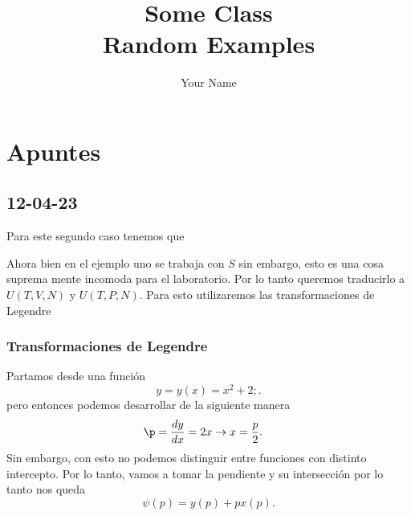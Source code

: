 \documentclass{report}
\title{\Huge{Some Class}\\Random Examples}
\author{\huge{Your Name}}
\date{}
\begin{document}
\maketitle
\newpage%
\tableofcontents
\pagebreak

\chapter{Apuntes}
\section{12-04-23}
Para este segundo caso tenemos que

Ahora bien en el ejemplo uno se trabaja con $S$ sin embargo, esto es una cosa suprema mente incomoda para el laboratorio. Por lo tanto queremos traducirlo a  $U(T,V,N)$ y  $U(T,P,N)$.
Para esto utilizaremos las transformaciones de Legendre

\subsection{Transformaciones de Legendre}
Partamos desde una función \[
y=y(x)=x^2+2;
.\] 
pero entonces podemos desarrollar de la siguiente manera
\begin{align*}
  \p&=\frac{dy}{dx}=2x \to x = \frac{p}{2}
.\end{align*}
Sin embargo, con esto no podemos distinguir entre funciones con distinto intercepto. Por lo tanto, vamos a tomar la pendiente y su intersección por lo tanto nos queda \[
  \psi(p) = y(p) + px(p)
.\] 
\end{document}
